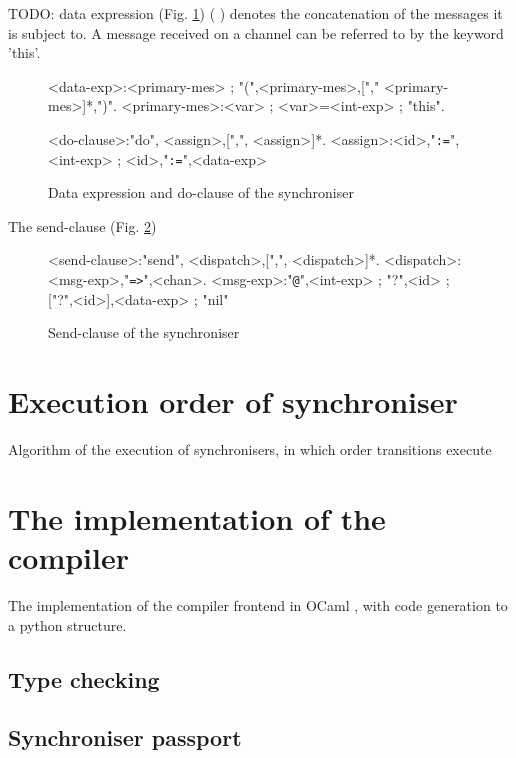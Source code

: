 TODO: data expression (Fig. \ref{sync_syntax:do})
( ) denotes the concatenation of the messages it is subject to.
A message received on a channel can be referred to by the keyword 'this'.


\begin{figure}[h!]
\small
\begin{grammar}
<data-exp>:<primary-mes> ; "(",<primary-mes>,["," <primary-mes>]*,")".
<primary-mes>:<var> ; <var>=<int-exp> ; "this".

<do-clause>:"do", <assign>,[",", <assign>]*.
<assign>:<id>,"{\tt :=}",<int-exp> ; <id>,"{\tt :=}",<data-exp>
\end{grammar}
\caption{Data expression and do-clause of the synchroniser}
\label{sync_syntax:do}
\end{figure}

The send-clause (Fig. \ref{sync_syntax:send})

\begin{figure}[h!]
\small
\begin{grammar}
<send-clause>:"send", <dispatch>,[",", <dispatch>]*.
<dispatch>:<msg-exp>,"{\tt =>}",<chan>.
<msg-exp>:"{\tt @}",<int-exp> ; "?",<id> ; ["?",<id>],<data-exp> ; "nil"
\end{grammar}
\caption{Send-clause of the synchroniser}
\label{sync_syntax:send}
\end{figure}


\section{Execution order of synchroniser\label{execod}}
Algorithm of the execution of synchronisers, in which order transitions execute


\section{The implementation of the compiler}
The implementation of the compiler frontend in OCaml \cite{realworldocaml}, with code generation to a python structure.

  \subsection{Type checking}
  \subsection{Synchroniser passport}
